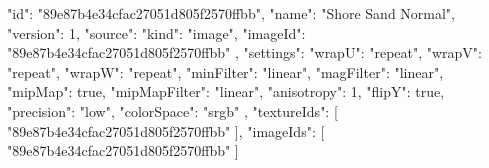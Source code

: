 {
  "id": "89e87b4e34cfac27051d805f2570ffbb",
  "name": "Shore Sand Normal",
  "version": 1,
  "source": {
    "kind": "image",
    "imageId": "89e87b4e34cfac27051d805f2570ffbb"
  },
  "settings": {
    "wrapU": "repeat",
    "wrapV": "repeat",
    "wrapW": "repeat",
    "minFilter": "linear",
    "magFilter": "linear",
    "mipMap": true,
    "mipMapFilter": "linear",
    "anisotropy": 1,
    "flipY": true,
    "precision": "low",
    "colorSpace": "srgb"
  },
  "textureIds": [
    "89e87b4e34cfac27051d805f2570ffbb"
  ],
  "imageIds": [
    "89e87b4e34cfac27051d805f2570ffbb"
  ]
}
